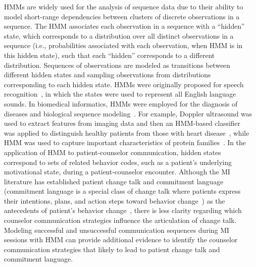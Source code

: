 HMMs are widely used for the analysis of sequence data due to their ability to model short-range dependencies between clusters of discrete observations in a sequence. The HMM associates each observation in a sequence with a ``hidden'' state, which corresponds to a distribution over all distinct observations in a sequence (i.e., probabilities associated with each observation, when HMM is in this hidden state), such that each ``hidden'' corresponds to a different distribution. Sequences of observations are modeled as transitions between different hidden states and sampling observations from distributions corresponding to each hidden state. HMMs were originally proposed for speech recognition~\cite{rabiner1989tutorial}, in which the states were used to represent all English language sounds. In biomedical informatics, HMMs were employed for the diagnosis of diseases and biological sequence modeling~\cite{uuguz2007biomedical, amrhein2003client}. For example, Doppler ultrasound was used to extract features from imaging data and then an HMM-based classifier was applied to distinguish healthy patients from those with heart disease~\cite{uuguz2007biomedical}, while HMM was used to capture important characteristics of protein families~\cite{amrhein2003client}. In the application of HMM to patient-counselor communication, hidden states correspond to sets of related behavior codes, such as a patient's underlying motivational state, during a patient-counselor encounter. Although the MI literature has established patient change talk and commitment language (commitment language is a special class of change talk where patients express their intentions, plans, and action steps toward behavior change~\cite{baldi1994hidden}) as the antecedents of patient's behavior change~\cite{apodaca2009mechanisms}, there is less clarity regarding which counselor communication strategies influence the articulation of change talk. Modeling successful and unsuccessful communication sequences during MI sessions with HMM can provide additional evidence to identify the counselor communication strategies that likely to lead to patient change talk and commitment language. 

